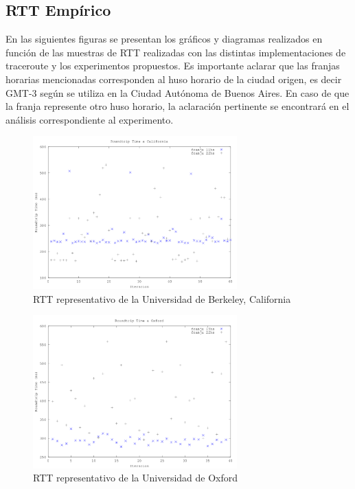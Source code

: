\subsection{RTT Empírico}

En las siguientes figuras se presentan los gráficos y diagramas realizados en función de las muestras de RTT realizadas con las distintas implementaciones de traceroute y los experimentos propuestos. Es importante aclarar que las franjas horarias mencionadas corresponden al huso horario de la ciudad origen, es decir GMT-3 según se utiliza en la Ciudad Autónoma de Buenos Aires. En caso de que la franja represente otro huso horario, la aclaración pertinente se encontrará en el análisis correspondiente al experimento.

\begin{figure}[h!]
  \centering
  \includegraphics[width=0.7\textwidth]{./figs/rtt_horarios_california.png}
  \caption{RTT representativo de la Universidad de Berkeley, California}
  \label{fig:rtt-horarios-california}
\end{figure}

\begin{figure}[h!]
  \centering
  \includegraphics[width=0.7\textwidth]{./figs/rtt_horarios_oxford.png}
  \caption{RTT representativo de la Universidad de Oxford}
  \label{fig:rtt-horarios-oxford}
\end{figure}

